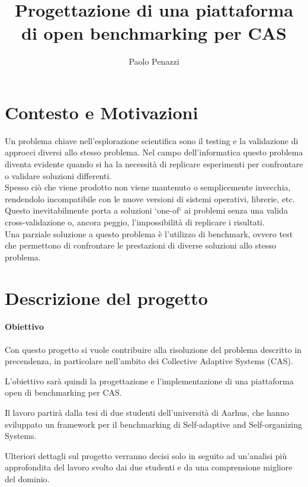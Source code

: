 \documentclass[12pt, a4paper]{article}
\title{Progettazione di una piattaforma di open benchmarking per CAS}
\author{Paolo Penazzi}
\begin{document}
\maketitle
%

\newpage

\section{Contesto e Motivazioni} \label{sec:context}

Un problema chiave nell'esplorazione scientifica sono il testing e la validazione di approcci diversi allo stesso 
problema.
Nel campo dell'informatica questo problema diventa evidente quando si ha la necessità di replicare esperimenti
per confrontare o validare soluzioni differenti. \\

Spesso ciò che viene prodotto non viene mantenuto o semplicemente invecchia, rendendolo incompatibile con le nuove 
versioni di sistemi operativi, librerie, etc.
Questo inevitabilmente porta a soluzioni `one-of` ai problemi senza una valida cross-validazione o, ancora peggio,
l'impossibilità di replicare i risultati. \\

Una parziale soluzione a questo problema è l'utilizzo di benchmark, ovvero test che permettono di confrontare le prestazioni di
diverse soluzioni allo stesso problema.

\section{Descrizione del progetto}

\paragraph{Obiettivo}

Con questo progetto si vuole contribuire alla risoluzione del problema descritto in precendenza, in particolare 
nell'ambito dei Collective Adaptive Systems (CAS).

L'obiettivo sarà quindi la progettazione e l'implementazione di una piattaforma open di benchmarking per 
CAS.

Il lavoro partirà dalla tesi di due studenti dell'università di Aarhus, che hanno sviluppato un framework per il 
benchmarking di Self-adaptive and Self-organizing Systems.

Ulteriori dettagli sul progetto verranno decisi solo in seguito ad un'analisi più approfondita del lavoro svolto dai 
due studenti e da una comprensione migliore del dominio.
\end{document}
